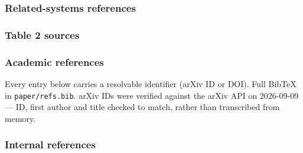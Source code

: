 \documentclass[
]{article}
\begin{document}
\subsubsection{Related-systems
references}\label{related-systems-references}

\subsubsection{Table 2 sources}\label{table-2-sources}

\subsubsection{Academic references}\label{academic-references}

Every entry below carries a resolvable identifier (arXiv ID or DOI).
Full BibTeX in \texttt{paper/refs.bib}. arXiv IDs were verified against
the arXiv API on 2026-09-09 --- ID, first author and title checked to
match, rather than transcribed from memory.

\subsubsection{Internal references}\label{internal-references}
\end{document}
